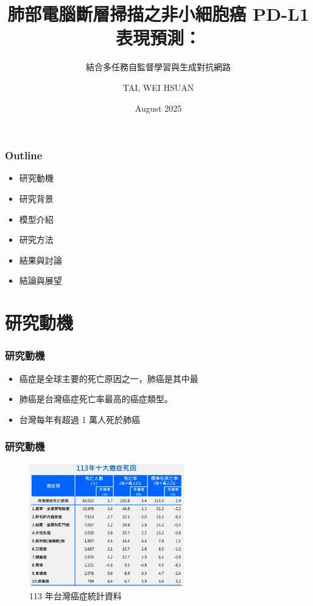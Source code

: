 \documentclass[xcolor=dvipsnames]{beamer}
\title{肺部電腦斷層掃描之非小細胞癌 PD-L1 表現預測：}
\subtitle{結合多任務自監督學習與生成對抗網路}
\author{TAI, WEI HSUAN}
\date{August 2025}
\begin{document}
	
	\begin{frame}
		\titlepage
	\end{frame}
    
	\begin{frame}
		\frametitle{Outline}
        \begin{itemize}
            \item 研究動機
            \item 研究背景
            \item 模型介紹
            \item 研究方法
            \item 結果與討論
            \item 結論與展望
        \end{itemize}
	\end{frame}

    \section{研究動機}
    \begin{frame}
        \sectionpage
    \end{frame}
    \begin{frame}
        \frametitle{研究動機}
        \begin{itemize}
            \item 癌症是全球主要的死亡原因之一，肺癌是其中最
            \item 肺癌是台灣癌症死亡率最高的癌症類型。
            \item 台灣每年有超過 1 萬人死於肺癌
        \end{itemize}
    \end{frame}

    \begin{frame}
        \frametitle{研究動機}
        \begin{figure}
            \centering
            \includegraphics[width=0.6\textwidth]{src/TW_113cancer_stat.png}
            \caption{113 年台灣癌症統計資料}
            \label{fig:113tw_cancer_stat}
        \end{figure}
    \end{frame}
\end{document}
